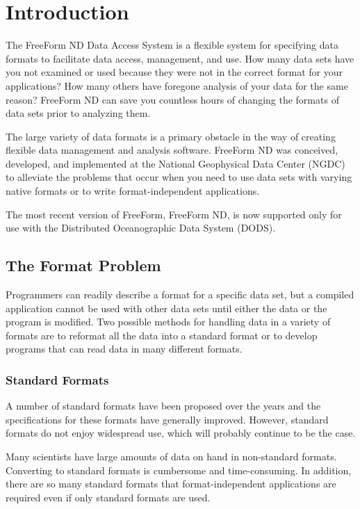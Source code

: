 %
%


\chapter{Introduction}
\label{ff,intro}

The FreeForm ND Data Access System is a flexible system for specifying
data formats to facilitate data access, management, and use. How many
data sets have you not examined or used because they were not in the
correct format for your applications? How many others have foregone
analysis of your data for the same reason? FreeForm ND can save you
countless hours of changing the formats of data sets prior to
analyzing them.

The large variety of data formats is a primary obstacle in the way of
creating flexible data management and analysis software. FreeForm ND
was conceived, developed, and implemented at the National Geophysical
Data Center (NGDC) to alleviate the problems that occur when you need
to use data sets with varying native formats or to write
format-independent applications.

The most recent version of FreeForm, FreeForm ND, is now supported
only for use with the Distributed Oceanographic Data System (DODS).

\section{The Format Problem}

Programmers can readily describe a format for a specific data set, but
a compiled application cannot be used with other data sets until
either the data or the program is modified. Two possible methods for
handling data in a variety of formats are to reformat all the data
into a standard format or to develop programs that can read data in
many different formats.

\subsection{Standard Formats}

A number of standard formats have been proposed over the years and the
specifications for these formats have generally improved. However,
standard formats do not enjoy widespread use, which will probably
continue to be the case.

Many scientists have large amounts of data on hand in non-standard
formats. Converting to standard formats is cumbersome and
time-consuming. In addition, there are so many standard formats that
format-independent applications are required even if only standard
formats are used.

